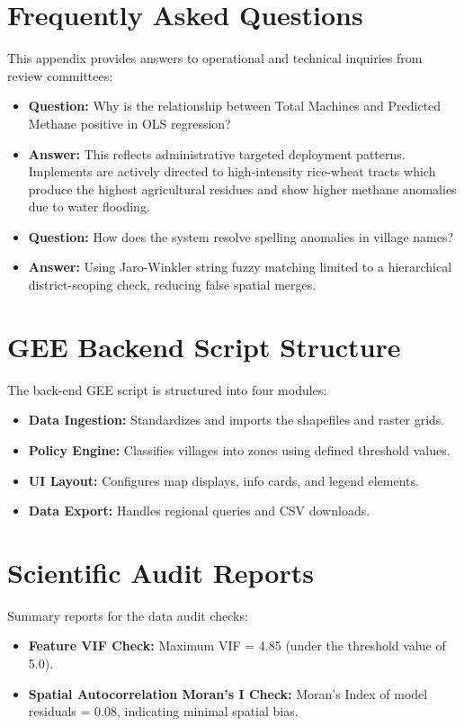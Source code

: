 \documentclass[12pt,a4paper]{report}
\begin{document}
\chapter{Frequently Asked Questions}
This appendix provides answers to operational and technical inquiries from review committees:
\begin{itemize}
    \item \textbf{Question:} Why is the relationship between Total Machines and Predicted Methane positive in OLS regression?
    \item \textbf{Answer:} This reflects administrative targeted deployment patterns. Implements are actively directed to high-intensity rice-wheat tracts which produce the highest agricultural residues and show higher methane anomalies due to water flooding.
    \item \textbf{Question:} How does the system resolve spelling anomalies in village names?
    \item \textbf{Answer:} Using Jaro-Winkler string fuzzy matching limited to a hierarchical district-scoping check, reducing false spatial merges.
\end{itemize}

\chapter{GEE Backend Script Structure}
The back-end GEE script is structured into four modules:
\begin{itemize}
    \item \textbf{Data Ingestion:} Standardizes and imports the shapefiles and raster grids.
    \item \textbf{Policy Engine:} Classifies villages into zones using defined threshold values.
    \item \textbf{UI Layout:} Configures map displays, info cards, and legend elements.
    \item \textbf{Data Export:} Handles regional queries and CSV downloads.
\end{itemize}

\chapter{Scientific Audit Reports}
Summary reports for the data audit checks:
\begin{itemize}
    \item \textbf{Feature VIF Check:} Maximum VIF = 4.85 (under the threshold value of 5.0).
    \item \textbf{Spatial Autocorrelation Moran's I Check:} Moran's Index of model residuals = 0.08, indicating minimal spatial bias.
\end{itemize}
\end{document}
